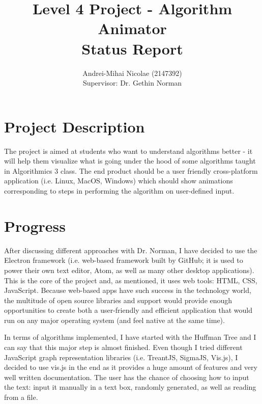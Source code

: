 \documentclass[11pt]{article}
\begin{document}
\posttitle{\end{center}}

\title{Level 4 Project - Algorithm Animator \\ Status Report}
\author{Andrei-Mihai Nicolae (2147392) \\ Supervisor: Dr. Gethin Norman}

\maketitle

\section{Project Description}
 The project is aimed at students who want to understand algorithms better - it will help them visualize what is going under the hood of some algorithms taught in Algorithmics 3 class. The end product should be a user friendly cross-platform application (i.e. Linux, MacOS, Windows) which should show animations corresponding to steps in performing the algorithm on user-defined input.
 
 \section{Progress}
 After discussing different approaches with Dr. Norman, I have decided to use the Electron framework (i.e. web-based framework built by GitHub; it is used to power their own text editor, Atom, as well as many other desktop applications). This is the core of the project and, as mentioned, it uses web tools: HTML, CSS, JavaScript. Because web-based apps have such success in the technology world, the multitude of open source libraries and support would provide enough opportunities to create both a user-friendly and efficient application that would run on any major operating system (and feel native at the same time).
 
 In terms of algorithms implemented, I have started with the Huffman Tree and I can say that this major step is almost finished. Even though I tried different JavaScript graph representation libraries (i.e. TreantJS, SigmaJS, Vis.js), I decided to use vis.js in the end as it provides a huge amount of features and very well written documentation. The user has the chance of choosing how to input the text: input it manually in a text box, randomly generated, as well as reading from a file. 
 
\end{document}
